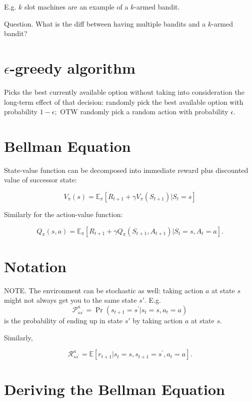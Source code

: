 \documentclass[12pt]{article}
\theoremstyle{plain}
\theoremstyle{definition}
\theoremstyle{remark}
\begin{document}
E.g. \( k \) slot machines are an example of a \( k \)-armed bandit.

Question. What is the diff between having multiple bandits and a \( k \)-armed
bandit?

\section{\( \epsilon \)-greedy algorithm}

Picks the best currently available option without taking into consideration the
long-term effect of that decision: randomly pick the best available option with
probability \( 1 - \epsilon; \) OTW randomly pick a random action with
probability $ \epsilon. $

\section{Bellman Equation}


State-value function can be decomposed into immediate reward plus discounted value of successor state:


\[
V _ { \pi } ( s ) = \mathbb { E } _ { \pi } \left[ R _ { t + 1 } + \gamma V _ { \pi } \left( S _ { t + 1 } \right) | S _ { t } = s \right]
\]

Similarly for the action-value function:

\[
Q _ { \pi } ( s , a ) = \mathbb { E } _ { \pi } \left[ R _ { t + 1 } + \gamma Q _ { \pi } \left( S _ { t + 1 } , A _ { t + 1 } \right) | S _ { t } = s , A _ { t } = a \right].
\]

\section{Notation}


NOTE. The environment can be stochastic as well: taking action \( a \) at state \( s \) might not always get you to the same state \( s'. \) E.g.
\[
\mathcal { P } _ { s s ^ { \prime } } ^ { a } = \operatorname { Pr } \left( s _ { t + 1 } = s ^ { \prime } | s _ { t } = s , a _ { t } = a \right)
\]
is the probability of ending up in state \( s' \) by taking action \( a \) at state \( s. \)

Similarly,

\[
\mathcal { R } _ { s s ^ { \prime } } ^ { a } = \mathbb { E } \left[ r _ { t + 1 } | s _ { t } = s , s _ { t + 1 } = s ^ { \prime } , a _ { t } = a \right].
\]

\section{Deriving the Bellman Equation}
\end{document}
